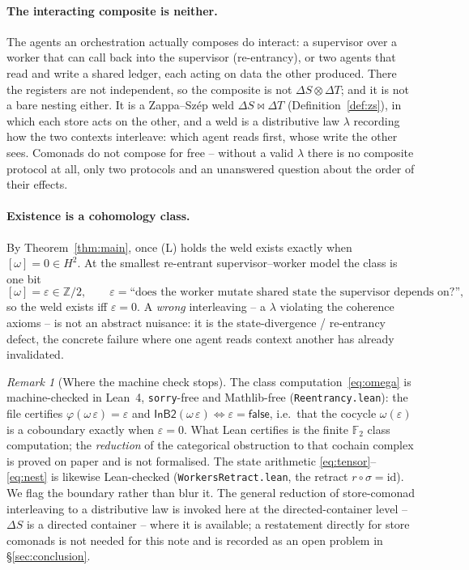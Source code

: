 \documentclass[11pt]{amsart}
\newcommand{\zs}{\bowtie}                          %
\theoremstyle{plain}
\theoremstyle{definition}
\theoremstyle{remark}
\newtheorem{remark}{Remark}
\begin{document}
\paragraph{The interacting composite is neither.}
The agents an orchestration actually composes do interact: a supervisor over a worker that can call
back into the supervisor (re-entrancy), or two agents that read and write a shared ledger, each
acting on data the other produced. There the registers are not independent, so the composite is not
$\Delta S\otimes\Delta T$; and it is not a bare nesting either. It is a Zappa--Sz\'ep weld
$\Delta S\zs\Delta T$ (Definition~\ref{def:zs}), in which each store acts on the other, and a weld is
a distributive law $\lambda$ recording how the two contexts interleave: which agent reads first,
whose write the other sees. Comonads do not compose for free -- without a valid $\lambda$ there is no
composite protocol at all, only two protocols and an unanswered question about the order of their
effects.

\paragraph{Existence is a cohomology class.}
By Theorem~\ref{thm:main}, once (L) holds the weld exists exactly when $[\omega]=0\in H^2$. At the
smallest re-entrant supervisor--worker model the class is one bit
\begin{equation}\label{eq:omega}
  [\omega]=\varepsilon\in\mathbb{Z}/2,\qquad
  \varepsilon=\text{``does the worker mutate shared state the supervisor depends on?''},
\end{equation}
so the weld exists iff $\varepsilon=0$. A \emph{wrong} interleaving -- a $\lambda$ violating the
coherence axioms -- is not an abstract nuisance: it is the state-divergence / re-entrancy defect, the
concrete failure where one agent reads context another has already invalidated.

\begin{remark}[Where the machine check stops]\label{rem:lean}
The class computation~\eqref{eq:omega} is machine-checked in Lean~4, \texttt{sorry}-free and
Mathlib-free (\texttt{Reentrancy.lean}): the file certifies $\varphi(\omega\,\varepsilon)=\varepsilon$
and $\mathsf{InB2}(\omega\,\varepsilon)\Leftrightarrow\varepsilon=\mathsf{false}$, i.e.\ that the
cocycle $\omega(\varepsilon)$ is a coboundary exactly when $\varepsilon=0$. What Lean certifies is the
finite $\mathbb{F}_2$ class computation; the \emph{reduction} of the categorical obstruction to that
cochain complex is proved on paper and is not formalised. The state arithmetic
\eqref{eq:tensor}--\eqref{eq:nest} is likewise Lean-checked (\texttt{WorkersRetract.lean}, the retract
$r\circ\sigma=\mathrm{id}$). We flag the boundary rather than blur it. The general reduction of
store-comonad interleaving to a distributive law is invoked here at the directed-container level --
$\Delta S$ is a directed container -- where it is available; a restatement directly for store comonads
is not needed for this note and is recorded as an open problem in \S\ref{sec:conclusion}.
\end{remark}
\end{document}
